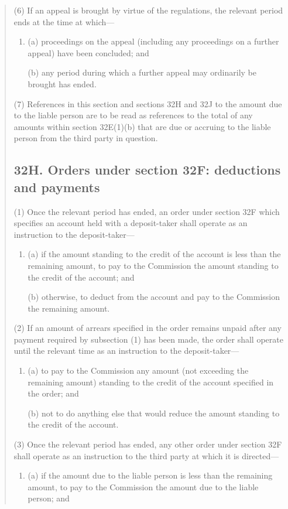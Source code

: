 \documentclass[a4paper]{article}
\begin{document}
\begin{quotation}
(6) If an appeal is brought by virtue of the regulations, the relevant period ends at the time at which---
\begin{enumerate}\item[]
(a) proceedings on the appeal (including any proceedings on a further appeal) have been concluded; and

(b) any period during which a further appeal may ordinarily be brought has ended.
\end{enumerate}

(7) References in this section and sections 32H and 32J to the amount due to the liable person are to be read as references to the total of any amounts within section 32E(1)(b) that are due or accruing to the liable person from the third party in question.

\subsection*{32H. Orders under section 32F: deductions and payments}

(1) Once the relevant period has ended, an order under section 32F which specifies an account held with a deposit-taker shall operate as an instruction to the deposit-taker---
\begin{enumerate}\item[]
(a) if the amount standing to the credit of the account is less than the remaining amount, to pay to the Commission the amount standing to the credit of the account; and

(b) otherwise, to deduct from the account and pay to the Commission the remaining amount.
\end{enumerate}

(2) If an amount of arrears specified in the order remains unpaid after any payment required by subsection (1) has been made, the order shall operate until the relevant time as an instruction to the deposit-taker---
\begin{enumerate}\item[]
(a) to pay to the Commission any amount (not exceeding the remaining
amount) standing to the credit of the account specified in the order; and

(b) not to do anything else that would reduce the amount standing to the credit
of the account.
\end{enumerate}

(3) Once the relevant period has ended, any other order under section 32F shall
operate as an instruction to the third party at which it is directed---
\begin{enumerate}\item[]
(a) if the amount due to the liable person is less than the remaining amount, to
pay to the Commission the amount due to the liable person; and


\end{enumerate}
\end{quotation}
\end{document}
